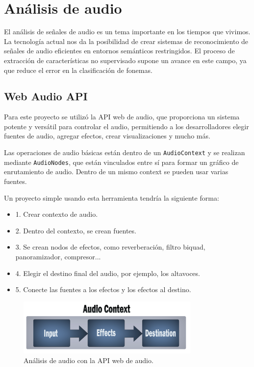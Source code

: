 \documentclass[a4paper, 12pt]{book}
\begin{document}
\section{Análisis de audio}
\label{sec:analisis-audio}

El análisis de señales de audio\cite{gonzalez2019analisis} es un tema importante en los tiempos que vivimos. La tecnología actual nos da la posibilidad de crear sistemas de reconocimiento de señales de audio eficientes en entornos semánticos restringidos. El proceso de extracción de características no supervisado supone un avance en este campo, ya que reduce el error en la clasificación de fonemas.

\subsection{Web Audio API}
\label{subsec:audio-api}

Para este proyecto se utilizó la API web de audio\cite{web-audio-api}, que proporciona un sistema potente y versátil para controlar el audio, permitiendo a los desarrolladores elegir fuentes de audio, agregar efectos, crear visualizaciones y mucho más.

Las operaciones de audio básicas están dentro de un \texttt{AudioContext} y se realizan mediante \texttt{AudioNodes}, que están vinculados entre sí para formar un gráfico de enrutamiento de audio. Dentro de un mismo context se pueden usar varias fuentes.

Un proyecto simple usando esta herramienta tendría la siguiente forma:

\begin{itemize}
	\item 1. Crear contexto de audio.
	\item 2. Dentro del contexto, se crean fuentes.
	\item 3. Se crean nodos de efectos, como reverberación, filtro biquad, panoramizador, compresor...
	\item 4. Elegir el destino final del audio, por ejemplo, los altavoces.
	\item 5. Conecte las fuentes a los efectos y los efectos al destino.
\end{itemize}

\begin{figure}
	\centering
	\includegraphics[width=9cm, keepaspectratio]{img/web-audio-api.png}
	\caption{Análisis de audio con la API web de audio.}\label{fig:audio-api}
\end{figure}
\end{document}
